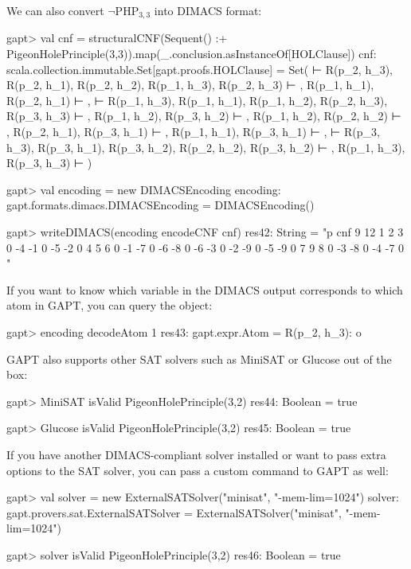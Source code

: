 \documentclass[a4paper,11pt]{book}
\newcommand{\cli}[1]{{\ttfamily {#1}}}
\begin{document}
We can also convert $\neg\mathrm{PHP}_{3,3}$ into DIMACS format:
\begin{clilisting}
gapt> val cnf = structuralCNF(Sequent() :+ PigeonHolePrinciple(3,3)).map(_.conclusion.asInstanceOf[HOLClause])
cnf: scala.collection.immutable.Set[gapt.proofs.HOLClause] = Set( ⊢ R(p_2, h_3), R(p_2, h_1), R(p_2, h_2), R(p_1, h_3), R(p_2, h_3) ⊢ , R(p_1, h_1), R(p_2, h_1) ⊢ ,  ⊢ R(p_1, h_3), R(p_1, h_1), R(p_1, h_2), R(p_2, h_3), R(p_3, h_3) ⊢ , R(p_1, h_2), R(p_3, h_2) ⊢ , R(p_1, h_2), R(p_2, h_2) ⊢ , R(p_2, h_1), R(p_3, h_1) ⊢ , R(p_1, h_1), R(p_3, h_1) ⊢ ,  ⊢ R(p_3, h_3), R(p_3, h_1), R(p_3, h_2), R(p_2, h_2), R(p_3, h_2) ⊢ , R(p_1, h_3), R(p_3, h_3) ⊢ )

gapt> val encoding = new DIMACSEncoding
encoding: gapt.formats.dimacs.DIMACSEncoding = DIMACSEncoding()

gapt> writeDIMACS(encoding encodeCNF cnf)
res42: String =
"p cnf 9 12
1 2 3 0
-4 -1 0
-5 -2 0
4 5 6 0
-1 -7 0
-6 -8 0
-6 -3 0
-2 -9 0
-5 -9 0
7 9 8 0
-3 -8 0
-4 -7 0
"

\end{clilisting}

If you want to know which variable in the DIMACS output corresponds to which
atom in GAPT, you can query the \cli{DIMACSEncoding} object:
\begin{clilisting}
gapt> encoding decodeAtom 1
res43: gapt.expr.Atom = R(p_2, h_3): o

\end{clilisting}

GAPT also supports other SAT solvers such as MiniSAT or Glucose out of the box:
\begin{clilisting}
gapt> MiniSAT isValid PigeonHolePrinciple(3,2)
res44: Boolean = true

\end{clilisting}
\begin{clilisting}
gapt> Glucose isValid PigeonHolePrinciple(3,2)
res45: Boolean = true

\end{clilisting}

If you have another DIMACS-compliant solver installed or want to pass extra
options to the SAT solver, you can pass a custom command to GAPT as well:
\begin{clilisting}
gapt> val solver = new ExternalSATSolver("minisat", "-mem-lim=1024")
solver: gapt.provers.sat.ExternalSATSolver = ExternalSATSolver("minisat", "-mem-lim=1024")

gapt> solver isValid PigeonHolePrinciple(3,2)
res46: Boolean = true

\end{clilisting}
\end{document}
